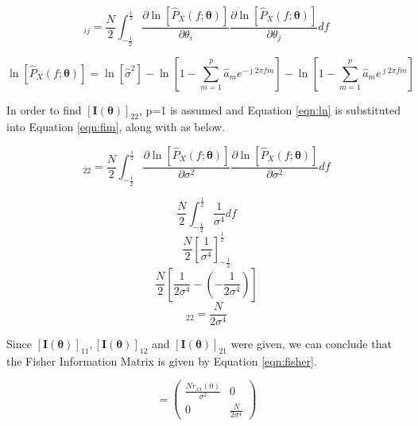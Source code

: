 \begin{equation}
[\mathbf{I}(\boldsymbol{\theta})]_{i j}=\frac{N}{2} \int_{-\frac{1}{2}}^{\frac{1}{2}} \frac{\partial \ln \left[\hat{P}_{X}(f ; \boldsymbol{\theta})\right]}{\partial \theta_{i}} \frac{\partial \ln \left[\hat{P}_{X}(f ; \boldsymbol{\theta})\right]}{\partial \theta_{j}} d f
\label{eqn:fim}
\end{equation}

\begin{equation}
\ln \left[\hat{P}_{X}(f ; \boldsymbol{\theta})\right]=\ln \left[\hat{\sigma}^{2}\right]-\ln \left[1-\sum_{m=1}^{p} \hat{a}_{m} e^{-\jmath 2 \pi f m}\right]-\ln \left[1-\sum_{m=1}^{p} \hat{a}_{m} e^{\jmath 2 \pi f m}\right]
\label{eqn:ln}
\end{equation}

\noindent
In order to find $[\mathbf{I}(\boldsymbol{\theta})]_{2 2}$, p=1 is assumed and Equation \ref{eqn:ln} is substituted into Equation \ref{eqn:fim}, along with \boldsymbol{\theta} as below.

\begin{equation}
[\boldsymbol{I}(\boldsymbol{\theta})]_{22}=\frac{N}{2} \int_{-\frac{1}{2}}^{\frac{1}{2}} \frac{\partial \ln \left[\hat{P}_{X}(f ; \boldsymbol{\theta})\right]}{\partial \sigma^{2}} \frac{\partial \ln \left[\hat{P}_{X}(f ; \boldsymbol{\theta})\right]}{\partial \sigma^{2}} d f
\end{equation}

\begin{equation}
\frac{N}{2} \int_{-\frac{1}{2}}^{\frac{1}{2}} \frac{1}{\sigma^{4}} d f
\end{equation}
\begin{equation}
\frac{N}{2}\left[\frac{1}{\sigma^{4}}\right]_{-\frac{1}{2}}^{\frac{1}{2}}
\end{equation}
\begin{equation}
\frac{N}{2}\left[\frac{1}{2 \sigma^{4}}-\left(-\frac{1}{2 \sigma^{4}}\right)\right]
\end{equation}
\begin{equation}
[\boldsymbol{I}(\boldsymbol{\theta})]_{22}=\frac{N}{2 \sigma^{4}}
\end{equation}

\noindent
Since $[\boldsymbol{I}(\boldsymbol{\theta})]_{11}, [\boldsymbol{I}(\boldsymbol{\theta})]_{12}$ and $[\boldsymbol{I}(\boldsymbol{\theta})]_{21}$ were given, we can conclude that the Fisher Information Matrix is given by Equation
\ref{eqn:fisher}.

\begin{equation}
[\boldsymbol{I}(\boldsymbol{\theta})]=\left(\begin{array}{cc}
\frac{N r_{x x}(0)}{\sigma^{2}} & 0 \\
0 & \frac{N}{2 \sigma^{4}}
\end{array}\right)
\label{eqn:fisher}
\end{equation}

